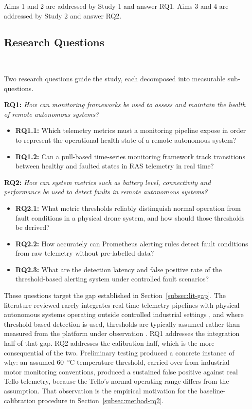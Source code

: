 Aims 1 and 2 are addressed by Study 1 and answer RQ1. Aims 3 and 4 are addressed
by Study 2 and answer RQ2.

\subsection{Research Questions}~\label{subsec:method-rqs}

Two research questions guide the study, each decomposed into measurable
sub-questions.

\vspace{0.5em}
\noindent\textbf{RQ1:} \textit{How can monitoring frameworks be used to assess
and maintain the health of remote autonomous systems?}

\begin{itemize}
    \item \textbf{RQ1.1:} Which telemetry metrics must a monitoring pipeline
    expose in order to represent the operational health state of a remote
    autonomous system?
    \item \textbf{RQ1.2:} Can a pull-based time-series monitoring framework track
    transitions between healthy and faulted states in RAS telemetry in real time?
\end{itemize}

\vspace{0.5em}
\noindent\textbf{RQ2:} \textit{How can system metrics such as battery level,
connectivity and performance be used to detect faults in remote autonomous
systems?}

\begin{itemize}
    \item \textbf{RQ2.1:} What metric thresholds reliably distinguish normal
    operation from fault conditions in a physical drone system, and how should
    those thresholds be derived?
    \item \textbf{RQ2.2:} How accurately can Prometheus alerting rules detect
    fault conditions from raw telemetry without pre-labelled data?
    \item \textbf{RQ2.3:} What are the detection latency and false positive rate
    of the threshold-based alerting system under controlled fault scenarios?
\end{itemize}

These questions target the gap established in Section~\ref{subsec:lit-gap}. The
literature reviewed rarely integrates real-time telemetry pipelines with physical
autonomous systems operating outside controlled industrial settings
\citep{boncea2016, devi2024}, and where threshold-based detection is used,
thresholds are typically assumed rather than measured from the platform under
observation \citep{yousuf2024}. RQ1 addresses the integration half of that gap.
RQ2 addresses the calibration half, which is the more consequential of the two.
Preliminary testing produced a concrete instance of why: an assumed
\SI{60}{\celsius} temperature threshold, carried over from industrial motor
monitoring conventions, produced a sustained false positive against real Tello
telemetry, because the Tello's normal operating range differs from the
assumption. That observation is the empirical motivation for the
baseline-calibration procedure in Section~\ref{subsec:method-rq2}.

